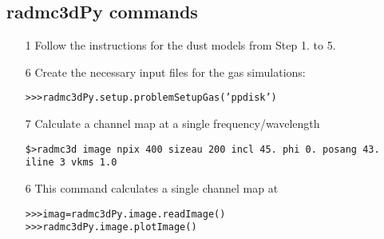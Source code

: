 \documentclass[12pt]{article}
\newcommand{\pymod}{{\tt  radmc3dPy }}
\begin{document}
\subsection*{radmc3dPy commands}
\begin{itemize}

\item[1] Follow the instructions for the dust models from Step 1. to 5. 
%
%
%
%
\item[6] Create the necessary input files for the gas simulations:

{\tt>>>radmc3dPy.setup.problemSetupGas('ppdisk')}\\

\item[7] Calculate a channel map at a single frequency/wavelength

{\tt \$>radmc3d image npix 400 sizeau 200 incl 45. phi 0. posang 43. iline 3 vkms 1.0}\\
\item[6] This command calculates a single channel map at 

{\tt>>>imag=radmc3dPy.image.readImage()}\\
{\tt>>>radmc3dPy.image.plotImage()}

\end{itemize}
\end{document}
